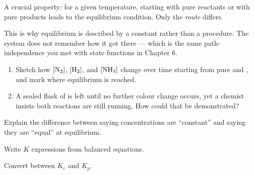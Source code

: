 \documentclass{apchem-notes}
\begin{document}

A crucial property: for a given temperature, starting with pure reactants or
with pure products leads to the  equilibrium
condition. Only the \emph{route} differs.

\begin{apcnote}
This is why equilibrium is described by a constant rather than a
procedure. The system does not remember how it got there --- which is the
same path-independence you met with state functions in Chapter 6.
\end{apcnote}


\begin{enumerate}[leftmargin=*,itemsep=0.4em]
  \item Sketch how $[\ce{N2}]$, $[\ce{H2}]$, and $[\ce{NH3}]$ change over
        time starting from pure  and , and mark where
        equilibrium is reached. \workspace[3.6cm]
  \item A sealed flask of  is left until no further colour change
        occurs, yet a chemist insists both reactions are still running.
        How could that be demonstrated? 
\end{enumerate}

\begin{exitticket}
Explain the difference between saying concentrations are ``constant'' and
saying they are ``equal'' at equilibrium.
\end{exitticket}


\begin{objectives}
  \item Write $K$ expressions from balanced equations.
  \item Convert between $K_c$ and $K_p$.
\end{objectives}
\end{document}
